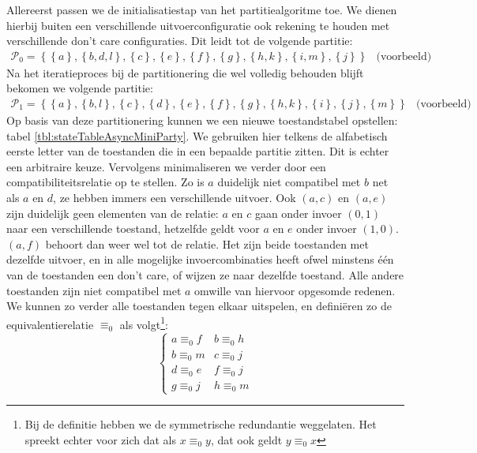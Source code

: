 Allereerst passen we de initialisatiestap van het partitiealgoritme toe. We dienen hierbij buiten een verschillende uitvoerconfiguratie ook rekening te houden met verschillende don't care configuraties. Dit leidt tot de volgende partitie:
\begin{equation}
\begin{array}{lr}
\mathcal{P}_0=\left\{\left\{a\right\},\left\{b,d,l\right\},\left\{c\right\},\left\{e\right\},\left\{f\right\},\left\{g\right\},\left\{h,k\right\},\left\{i,m\right\},\left\{j\right\}\right\}&\mbox{(voorbeeld)}
\end{array}
\end{equation}
Na het iteratieproces bij de partitionering die wel volledig behouden blijft bekomen we volgende partitie:
\begin{equation}
\begin{array}{lr}
\mathcal{P}_1=\left\{\left\{a\right\},\left\{b,l\right\},\left\{c\right\},\left\{d\right\},\left\{e\right\},\left\{f\right\},\left\{g\right\},\left\{h,k\right\},\left\{i\right\},\left\{j\right\},\left\{m\right\}\right\}&\mbox{(voorbeeld)}
\end{array}
\end{equation}
Op basis van deze partitionering kunnen we een nieuwe toestandstabel opstellen: tabel \ref{tbl:stateTableAsyncMiniParty}. We gebruiken hier telkens de alfabetisch eerste letter van de toestanden die in een bepaalde partitie zitten. Dit is echter een arbitraire keuze. Vervolgens minimaliseren we verder door een compatibiliteitsrelatie op te stellen. Zo is $a$ duidelijk niet compatibel met $b$ net als $a$ en $d$, ze hebben immers een verschillende uitvoer. Ook $\left(a,c\right)$ en $\left(a,e\right)$ zijn duidelijk geen elementen van de relatie: $a$ en $c$ gaan onder invoer $\left(0,1\right)$ naar een verschillende toestand, hetzelfde geldt voor $a$ en $e$ onder invoer $\left(1,0\right)$. $\left(a,f\right)$ behoort dan weer wel tot de relatie. Het zijn beide toestanden met dezelfde uitvoer, en in alle mogelijke invoercombinaties heeft ofwel minstens \'e\'en van de toestanden een don't care, of wijzen ze naar dezelfde toestand. Alle andere toestanden zijn niet compatibel met $a$ omwille van hiervoor opgesomde redenen. We kunnen zo verder alle toestanden tegen elkaar uitspelen, en defini\"eren zo de equivalentierelatie $\equiv_0$ als volgt\footnote{Bij de definitie hebben we de symmetrische redundantie weggelaten. Het spreekt echter voor zich dat als $x\equiv_0y$, dat ook geldt $y\equiv_0x$}:
\begin{equation}
\left\{\begin{array}{cc}
a\equiv_0f&b\equiv_0h\\
b\equiv_0m&c\equiv_0j\\
d\equiv_0e&f\equiv_0j\\
g\equiv_0j&h\equiv_0m
\end{array}\right.
\end{equation}
